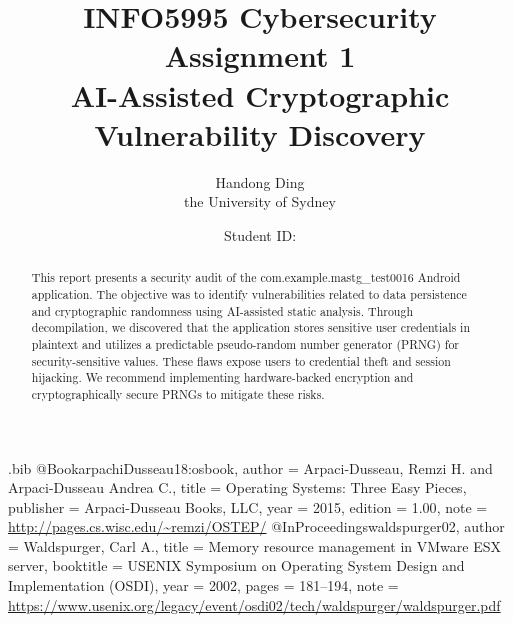 \usepackage{filecontents}

\begin{filecontents}{\jobname.bib}
@Book{arpachiDusseau18:osbook,
  author =       {Arpaci-Dusseau, Remzi H. and Arpaci-Dusseau Andrea C.},
  title =        {Operating Systems: Three Easy Pieces},
  publisher =    {Arpaci-Dusseau Books, LLC},
  year =         2015,
  edition =      {1.00},
  note =         {\url{http://pages.cs.wisc.edu/~remzi/OSTEP/}}
}
@InProceedings{waldspurger02,
  author =       {Waldspurger, Carl A.},
  title =        {Memory resource management in {VMware ESX} server},
  booktitle =    {USENIX Symposium on Operating System Design and
                  Implementation (OSDI)},
  year =         2002,
  pages =        {181--194},
  note =         {\url{https://www.usenix.org/legacy/event/osdi02/tech/waldspurger/waldspurger.pdf}}}
\end{filecontents}



\date{}

\title{\Large \bf INFO5995 Cybersecurity Assignment 1\\
  AI-Assisted Cryptographic Vulnerability Discovery}

\author{
{\rm Handong Ding}\\
the University of Sydney
\and
{\rm Student ID:}\\
} %

\maketitle

\begin{abstract}

This report presents a security audit of the com.example.mastg\_test0016 Android application. The objective was to identify vulnerabilities related to data persistence and cryptographic randomness using AI-assisted static analysis. Through decompilation, we discovered that the application stores sensitive user credentials in plaintext and utilizes a predictable pseudo-random number generator (PRNG) for security-sensitive values. These flaws expose users to credential theft and session hijacking. We recommend implementing hardware-backed encryption and cryptographically secure PRNGs to mitigate these risks.

\end{abstract}


